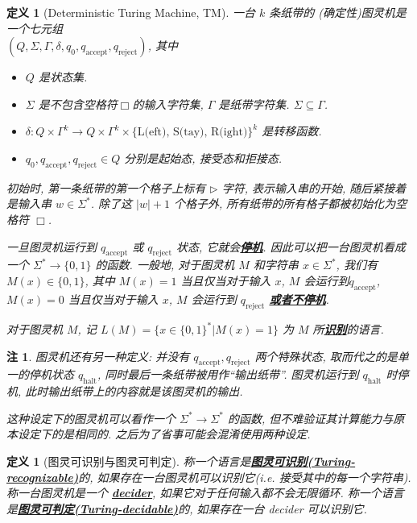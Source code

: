 \documentclass[8pt]{article}
\theoremstyle{compact}
\newtheorem{definition}[theorem]{定义}
\newtheorem{remark}[theorem]{注}
\def\obj#1{\textbf{\uline{#1}}}
\def\num#1{\textnormal{\textbf{\mbox{\textcolor{blue}{(#1)}}}}}
\begin{document}
\begin{definition}[Deterministic Turing Machine, TM]
	一台 $k$ 条纸带的 (确定性)图灵机是一个七元组 \\ $(Q, \Sigma, \Gamma, \delta, q_0, q_{\text{accept}}, q_{\text{reject}})$, 其中
	\begin{itemize}
		\item $Q$ 是状态集.
		\item $\Sigma$ 是不包含空格符$\Box$的输入字符集, $\Gamma$ 是纸带字符集. $\Sigma \subseteq \Gamma$.
		\item $\delta: Q \times \Gamma^k \to Q \times \Gamma^k \times \{\text{L(eft), S(tay), R(ight)}\}^k$ 是转移函数.
		\item $q_0, q_{\text{accept}}, q_{\text{reject}} \in Q$ 分别是起始态, 接受态和拒接态.
	\end{itemize}

	初始时, 第一条纸带的第一个格子上标有 $\triangleright$ 字符, 表示输入串的开始, 随后紧接着是输入串 $w \in \Sigma^*$. 除了这 $|w| + 1$ 个格子外, 所有纸带的所有格子都被初始化为空格符 $\Box$.

	一旦图灵机运行到 $q_{\text{accept}}$ 或 $q_{\text{reject}}$ 状态, 它就会\obj{停机}. 因此可以把一台图灵机看成一个 $\Sigma^* \to \{0, 1\}$ 的函数. 一般地, 对于图灵机 $M$ 和字符串 $x \in \Sigma^*$, 我们有 $M(x) \in \{0, 1\}$, 其中 $M(x) = 1$ 当且仅当对于输入 $x$, $M$ 会运行到$q_{\text{accept}}$, $M(x) = 0$ 当且仅当对于输入 $x$, $M$ 会运行到 $q_{\text{reject}}$ \obj{或者不停机}.

	对于图灵机 $M$, 记 $L(M) = \{x \in \{0, 1\}^* | M(x) = 1\}$ 为 $M$ 所\obj{识别}的语言.
\end{definition}
\begin{remark}
	图灵机还有另一种定义: 并没有 $q_{\text{accept}}, q_{\text{reject}}$ 两个特殊状态, 取而代之的是单一的停机状态 $q_{\text{halt}}$, 同时最后一条纸带被用作“输出纸带”. 图灵机运行到 $q_{\text{halt}}$ 时停机, 此时输出纸带上的内容就是该图灵机的输出. 

	这种设定下的图灵机可以看作一个 $\Sigma^* \to \Sigma^*$ 的函数, 但不难验证其计算能力与原本设定下的是相同的. 之后为了省事可能会混淆使用两种设定.
\end{remark}
\begin{definition}[图灵可识别与图灵可判定]
	称一个语言是\obj{图灵可识别(Turing-recognizable)}的, 如果存在一台图灵机可以识别它(i.e. 接受其中的每一个字符串). 称一台图灵机是一个 \obj{decider}, 如果它对于任何输入都不会无限循环. 称一个语言是\obj{图灵可判定(Turing-decidable)}的, 如果存在一台 decider 可以识别它.
\end{definition}
\end{document}
